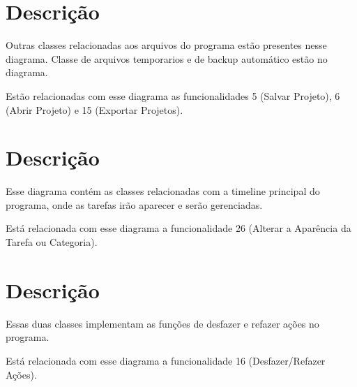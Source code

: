 \section{Descrição}
	Outras classes relacionadas aos arquivos do programa estão presentes nesse diagrama. Classe de arquivos temporarios e de backup automático estão no diagrama.
	
	Estão relacionadas com esse diagrama as funcionalidades 5 (Salvar Projeto), 6 (Abrir Projeto) e 15 (Exportar Projetos).

\section{Descrição}
	Esse diagrama contém as classes relacionadas com a timeline principal do programa, onde as tarefas irão aparecer e serão gerenciadas.
	
	Está relacionada com esse diagrama a funcionalidade 26 (Alterar a Aparência da Tarefa ou Categoria).

\section{Descrição}
	Essas duas classes implementam as funções de desfazer e refazer ações no programa.
	
	Está relacionada com esse diagrama a funcionalidade 16 (Desfazer/Refazer Ações).

	
